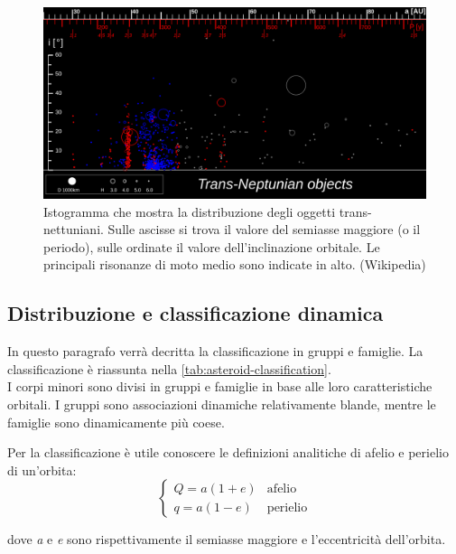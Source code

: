 \begin{figure}
    \centering
    \includegraphics[width=\textwidth]{figure/neptune_resonances.png}
    \caption[Risonanze di moto medio con Nettuno.]{Istogramma che mostra la distribuzione degli oggetti trans-nettuniani. Sulle ascisse si trova il valore del semiasse maggiore (o il periodo), sulle ordinate il valore dell'inclinazione orbitale. Le principali risonanze di moto medio sono indicate in alto. (Wikipedia)}
    \label{fig:neptune_resonances}
\end{figure}

\subsection{Distribuzione e classificazione dinamica}
In questo paragrafo verrà decritta la classificazione in gruppi e famiglie.
La classificazione è riassunta nella \cref{tab:asteroid-classification}.\\
I corpi minori sono divisi in gruppi e famiglie in base alle loro caratteristiche orbitali. 
I gruppi sono associazioni dinamiche relativamente blande, mentre le famiglie sono dinamicamente più coese.

Per la classificazione è utile conoscere le definizioni analitiche di afelio e perielio di un'orbita:
\begin{equation}
    \begin{cases}
        Q=a(1+e) &\text{afelio}\\
        q=a(1-e) &\text{perielio}
    \end{cases}
\end{equation}

dove \textit{a} e \textit{e} sono rispettivamente il semiasse maggiore e l'eccentricità dell'orbita.

